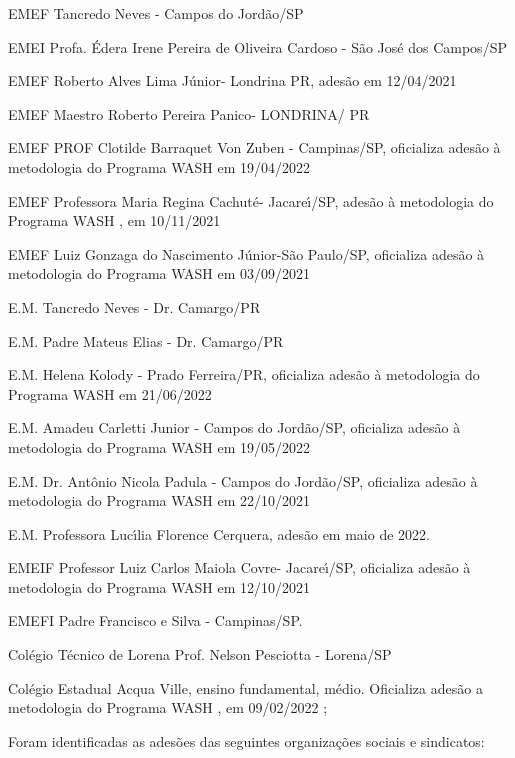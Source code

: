 \documentclass[
12pt,		%
openright,	%
twoside,  %
a4paper,			%
chapter=TITLE,		%
english,			%
french,				%
spanish,			%
brazil				%
]{USPSC-classe/USPSC}
\begin{document}
\begin{alineas}
\item EMEF Tancredo Neves - Campos do Jord\~ao/SP
\item EMEI Profa. \'Edera Irene Pereira de Oliveira Cardoso - S\~ao Jos\'e dos Campos/SP
\item EMEF Roberto Alves Lima J\'unior- Londrina PR, ades\~ao em 12/04/2021
\item EMEF Maestro Roberto Pereira Panico- LONDRINA/ PR
\item EMEF PROF Clotilde Barraquet Von Zuben - Campinas/SP, oficializa ades\~ao \`a metodologia do Programa WASH em 19/04/2022
\item EMEF Professora Maria Regina Cachut\'e- Jacare\'{\i}/SP, ades\~ao \`a metodologia do Programa WASH , em 10/11/2021
\item EMEF Luiz Gonzaga do Nascimento J\'unior-S\~ao Paulo/SP, oficializa ades\~ao \`a metodologia do Programa WASH em 03/09/2021
\item E.M. Tancredo Neves - Dr. Camargo/PR
\item E.M. Padre Mateus Elias - Dr. Camargo/PR
\item E.M. Helena Kolody - Prado Ferreira/PR, oficializa ades\~ao \`a metodologia do Programa WASH em 21/06/2022
\item E.M. Amadeu Carletti Junior - Campos do Jord\~ao/SP, oficializa ades\~ao \`a metodologia do Programa WASH em 19/05/2022
\item E.M. Dr. Ant\^onio Nicola Padula - Campos do Jord\~ao/SP, oficializa ades\~ao \`a metodologia do Programa WASH  em 22/10/2021
\item E.M. Professora Luc\'{\i}lia Florence Cerquera, ades\~ao em maio de 2022.
\item EMEIF Professor Luiz Carlos Maiola Covre- Jacare\'{\i}/SP, oficializa ades\~ao \`a metodologia do Programa WASH em 12/10/2021
\item EMEFI Padre Francisco e Silva - Campinas/SP. 
\item Col\'egio T\'ecnico de Lorena Prof. Nelson Pesciotta - Lorena/SP
\item Col\'egio  Estadual Acqua Ville, ensino fundamental, m\'edio.  Oficializa ades\~ao a metodologia do Programa WASH , em 09/02/2022 ;
\end{alineas}

Foram identificadas as ades\~oes das seguintes organiza\c{c}\~oes sociais e sindicatos:
\end{document}
